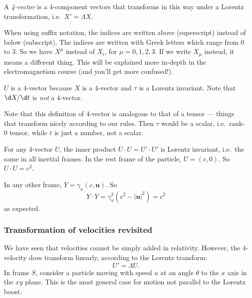 \documentclass[a4paper]{article}
\begin{document}
\begin{defi}[4-vector]
  A \emph{4-vector} is a 4-component vectors that transforms in this way under a Lorentz transformation, i.e.\ $X' = \Lambda X$.

  When using suffix notation, the indices are written above (superscript) instead of below (subscript). The indices are written with Greek letters which range from $0$ to $3$. So we have $X^\mu$ instead of $X_i$, for $\mu = 0, 1, 2, 3$. If we write $X_\mu$ instead, it means a different thing. This will be explained more in-depth in the electromagnetism course (and you'll get more confused!).
\end{defi}

$U$ is a 4-vector because $X$ is a 4-vector and $\tau$ is a Lorentz invariant. Note that $\d X/\d t$ is \emph{not} a 4-vector.

Note that this definition of 4-vector is analogous to that of a tensor --- things that transform nicely according to our rules. Then $\tau$ would be a scalar, i.e.\ rank-0 tensor, while $t$ is just a number, not a scalar.

For any 4-vector $U$, the inner product $U\cdot U = U' \cdot U'$ is Lorentz invariant, i.e.\ the same in all inertial frames. In the rest frame of the particle, $U = (c, 0)$. So $U\cdot U = c^2$.

In any other frame, $Y = \gamma_u(c, \mathbf{u})$. So
\[
  Y\cdot Y = \gamma_u^2 (c^2 - |\mathbf{u}|^2) = c^2
\]
as expected.

\subsubsection*{Transformation of velocities revisited}
We have seen that velocities cannot be simply added in relativity. However, the 4-velocity does transform linearly, according to the Lorentz transform:
\[
  U' = \Lambda U.
\]
In frame $S$, consider a particle moving with speed $u$ at an angle $\theta$ to the $x$ axis in the $xy$ plane. This is the most general case for motion not parallel to the Lorentz boost.
\end{document}
